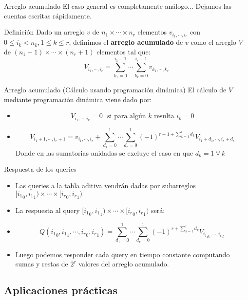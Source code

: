 \documentclass{beamer}
\begin{document}
\begin{frame}{Arreglo acumulado}
    El caso general es completamente análogo... Dejamos las cuentas escritas rápidamente.
   \begin{block}{Definición}
      Dado un arreglo $v$ de $n_1 \times \cdots \times n_r$ elementos $v_{i_1,\cdots,i_r}$ con $0 \leq i_k < n_k, 1\leq k \leq r$,
      definimos el \textbf{arreglo acumulado} de $v$ como el arreglo $V$ de $(n_1+1) \times \cdots \times (n_r+1)$ elementos
      tal que:
      $$V_{i_1,\cdots,i_r} = \sum_{k_1=0}^{i_1-1} \cdots \sum_{k_r=0}^{i_r-1}{v_{k_1,\cdots,k_r}}$$
  \end{block}
\end{frame}
\begin{frame}{Arreglo acumulado (Cálculo usando programación dinámica)}
   El cálculo de $V$ mediante programación dinámica viene dado por:
      \begin{itemize}
        \item $$V_{i_1, \cdots, i_r} = 0\ \ \ \mbox{si para algún $k$ resulta $i_k = 0$}$$
        \item $$V_{i_1+1,\cdots,i_r+1} = v_{i_1,\cdots,i_r} + \sum_{d_1=0}^1 \cdots \sum_{d_r=0}^1 {(-1)^{r+1 + \sum\limits_{k=1}^r{d_k}}V_{i_1+d_1,\cdots,i_r+d_r}}$$
                Donde en las sumatorias anidadas se excluye el caso en que $d_k = 1 \ \forall\ k$
      \end{itemize}
\end{frame}

\begin{frame}{Respuesta de los queries}
  \begin{itemize}
  \item Las queries a la tabla aditiva vendrán dadas por subarreglos $[{i_1}_0,{i_1}_1) \times \cdots \times [{i_r}_0,{i_r}_1)$
  \item La respuesta al query $[{i_1}_0,{i_1}_1) \times \cdots \times [{i_r}_0,{i_r}_1)$ será:
    \item
    $$Q({i_1}_0,{i_1}_1, \cdots ,{i_r}_0,{i_r}_1) = \sum_{d_1=0}^1 \cdots \sum_{d_r=0}^1 {(-1)^{r + \sum\limits_{k=1}^r{d_k}}V_{{i_1}_{d_1},\cdots,{i_r}_{d_r}}}$$
    \item Luego podemos responder cada query en tiempo constante computando sumas y restas de $2^r$ valores del arreglo acumulado.
  \end{itemize}
\end{frame}

\subsection{Aplicaciones prácticas}
\end{document}
